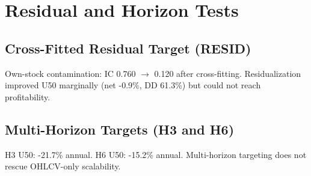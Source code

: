 \section{Residual and Horizon Tests}
\subsection{Cross-Fitted Residual Target (RESID)}
Own-stock contamination: IC 0.760 $\to$ 0.120 after cross-fitting.
Residualization improved U50 marginally (net -0.9\%, DD 61.3\%) but could not reach profitability.

\subsection{Multi-Horizon Targets (H3 and H6)}
H3 U50: -21.7\% annual. H6 U50: -15.2\% annual.
Multi-horizon targeting does not rescue OHLCV-only scalability.
